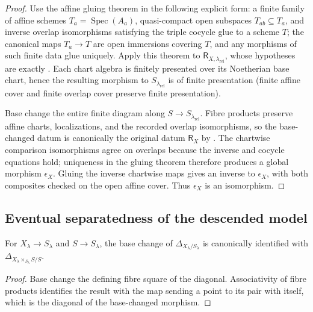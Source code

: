 \begin{proof}
  \leanok
  Use the affine gluing theorem in the following explicit form: a finite
  family of affine schemes $T_a=\operatorname{Spec}(A_a)$, quasi-compact open
  subspaces $T_{ab}\subseteq T_a$, and inverse overlap isomorphisms satisfying
  the triple cocycle glue to a scheme $T$; the canonical maps $T_a\to T$ are
  open immersions covering $T$, and any morphisms of such finite data glue
  uniquely.  Apply this theorem to
  $\mathsf R_{X,\lambda_{\mathrm{rel}}}$, whose hypotheses are exactly
  .  Each chart algebra
  is finitely presented over its Noetherian base chart, hence the resulting
  morphism to $S_{\lambda_{\mathrm{rel}}}$ is of finite presentation (finite
  affine cover and finite overlap cover preserve finite presentation).

  Base change the entire finite diagram along
  $S\to S_{\lambda_{\mathrm{rel}}}$.  Fibre products preserve affine charts,
  localizations, and the recorded overlap isomorphisms, so the base-changed
  datum is canonically the original datum $\mathsf R_X$ by
  .  The chartwise
  comparison isomorphisms agree on overlaps because the inverse and cocycle
  equations hold; uniqueness in the gluing theorem therefore produces a
  global morphism $\epsilon_X$.  Gluing the inverse chartwise maps gives an
  inverse to $\epsilon_X$, with both composites checked on the open affine
  cover.  Thus $\epsilon_X$ is an isomorphism.
\end{proof}

\subsection{Eventual separatedness of the descended model}

\begin{lemma}
  \label{lemma:nagata-diagonal-base-change}
  \leanok

  For $X_\lambda\to S_\lambda$ and $S\to S_\lambda$, the base change of
  $\Delta_{X_\lambda/S_\lambda}$ is canonically identified with
  $\Delta_{X_\lambda\times_{S_\lambda}S/S}$.
\end{lemma}

\begin{proof}
  \leanok
  Base change the defining fibre square of the diagonal.  Associativity of
  fibre products identifies the result with the map sending a point to its
  pair with itself, which is the diagonal of the base-changed morphism.
\end{proof}

